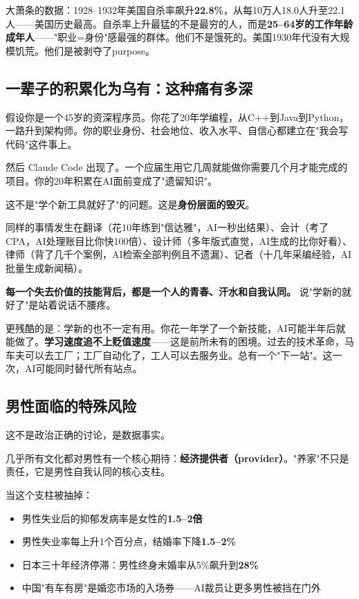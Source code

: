 \documentclass[a4paper,12pt,UTF8]{ctexart}
\begin{document}
大萧条的数据：1928--1932年美国自杀率飙升\textbf{22.8\%}，从每10万人18.0人升至22.1人——美国历史最高。自杀率上升最猛的不是最穷的人，而是\textbf{25--64岁的工作年龄成年人}——"职业=身份"感最强的群体。他们不是饿死的。美国1930年代没有大规模饥荒。他们是被剥夺了purpose。

\subsection{一辈子的积累化为乌有：这种痛有多深}

假设你是一个45岁的资深程序员。你花了20年学编程，从C++到Java到Python，一路升到架构师。你的职业身份、社会地位、收入水平、自信心都建立在"我会写代码"这件事上。

然后 Claude Code 出现了。一个应届生用它几周就能做你需要几个月才能完成的项目。你的20年积累在AI面前变成了"遗留知识"。

这不是"学个新工具就好了"的问题。这是\textbf{身份层面的毁灭}。

同样的事情发生在翻译（花10年练到"信达雅"，AI一秒出结果）、会计（考了CPA，AI处理账目比你快100倍）、设计师（多年版式直觉，AI生成的比你好看）、律师（背了几千个案例，AI检索全部判例且不遗漏）、记者（十几年采编经验，AI批量生成新闻稿）。

\textbf{每一个失去价值的技能背后，都是一个人的青春、汗水和自我认同。} 说"学新的就好了"是站着说话不腰疼。

更残酷的是：学新的也不一定有用。你花一年学了一个新技能，AI可能半年后就能做了。\textbf{学习速度追不上贬值速度}——这是前所未有的困境。过去的技术革命，马车夫可以去工厂；工厂自动化了，工人可以去服务业。总有一个"下一站"。这一次，AI可能同时替代所有站点。

\subsection{男性面临的特殊风险}

这不是政治正确的讨论，是数据事实。

几乎所有文化都对男性有一个核心期待：\textbf{经济提供者（provider）}。"养家"不只是责任，它是男性自我认同的核心支柱。

当这个支柱被抽掉：
\begin{itemize}
\item 男性失业后的抑郁发病率是女性的\textbf{1.5--2倍}
\item 男性失业率每上升1个百分点，结婚率下降\textbf{1.5--2\%}
\item 日本三十年经济停滞：男性终身未婚率从5\%飙升到\textbf{28\%}
\item 中国"有车有房"是婚恋市场的入场券——AI裁员让更多男性被挡在门外
\end{itemize}
\end{document}
